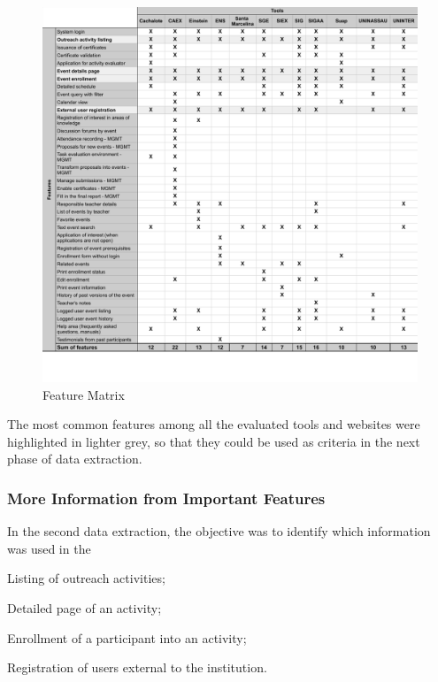 \begin{figure}[!htb]
  \caption{Feature Matrix}\label{fig:gl-matrix}
  \begin{center}
    \includegraphics[width=16cm]{img/functionality-matrix.pdf}
  \end{center}
\end{figure}

The most common features among all the evaluated tools and websites were highlighted in lighter grey, so that they could be used as criteria in the next phase of data extraction.

\subsubsection{More Information from Important Features}\label{sec:gl-data-extraction-2}

In the second data extraction, the objective was to identify which information was used in the
\begin{inparaenum}[(i)]
  \item Listing of outreach activities;
  \item Detailed page of an activity;
  \item Enrollment of a participant into an activity;
  \item Registration of users external to the institution.
\end{inparaenum}

